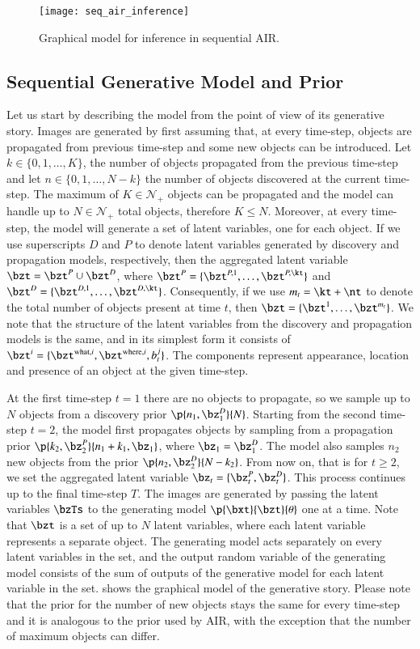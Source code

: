 \begin{figure}
    \texttt{[image: seq\_air\_inference]}
    \caption{Graphical model for inference in sequential AIR.}
    \label{fig:seq_air_inf}
\end{figure}

\subsection{Sequential Generative Model and Prior}

Let us start by describing the model from the point of view of its generative story. Images are generated by first assuming that, at every time-step, objects are propagated from previous time-step and some new objects can be introduced. Let $k \in \{0, 1, \dots, K\}$,  the number of objects propagated from the previous time-step and let $n \in \{0, 1, \dots, N - k\}$ the number of objects discovered at the current time-step. The maximum of $K \in \mathcal{N}_+$ objects can be propagated and the model can handle up to $N \in \mathcal{N}_+$ total objects, therefore $K \leq N$. Moreover, at every time-step, the model will generate a set of latent variables, one for each object. If we use superscripts $D$ and $P$ to denote latent variables generated by discovery and propagation models, respectively, then the aggregated latent variable $\bzt = \bzt^P \cup \bzt^D$, where $\bzt^P = \{ \bzt^{P, 1}, \dots, \bzt^{P, \kt} \}$ and $\bzt^D = \{ \bzt^{D, 1}, \dots, \bzt^{D, \kt} \}$. Consequently, if we use $m_t = \kt + \nt$ to denote the total number of objects present at time $t$, then $\bzt = \{ \bzt^1, \dots, \bzt^{m_t} \}$. We note that the structure of the latent variables from the discovery and propagation models is the same, and in its simplest form it consists of $\bzt^i = \{ \bzt^{\mathrm{what}, i}, \bzt^{\mathrm{where}, i}, b_t^j \}$. The components represent appearance, location and presence of an object at the given time-step.

 At the first time-step $t = 1$ there are no objects to propagate, so we sample up to $N$ objects from a discovery prior $\p{n_1, \bz_1^D}{N}$. Starting from the second time-step $t=2$, the model first propagates objects by sampling from a propagation prior $\p{k_2, \bz_2^P}{n_1 + k_1, \bz_1}$, where $\bz_1 = \bz_1^D$. The model also samples $n_2$ new objects from the prior $\p{n_2, \bz_2^D}{N - k_2}$. From now on, that is for $t \geq 2$, we set the aggregated latent variable $\bz_t = \{\bz_t^P, \bz_t^D\}$. This process continues up to the final time-step $T$. The images are generated by passing the latent variables $\bzTs$ to the generating model $\p{\bxt}{\bzt}{\theta}$ one at a time. Note that $\bzt$ is a set of up to $N$ latent variables, where each latent variable represents a separate object. The generating model acts separately on every latent variables in the set, and the output random variable of the generating model consists of the sum of outputs of the generative model for each latent variable in the set.  shows the graphical model of the generative story. Please note that the prior for the number of new objects stays the same for every time-step and it is analogous to the prior used by AIR, with the exception that the number of maximum objects can differ.

